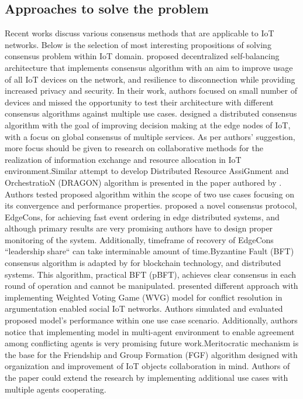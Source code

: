 \documentclass[	DIV=calc,%
							paper=a4,%
							fontsize=11pt,%
							twocolumn]{scrartcl}	 				%
\begin{document}
\subsection{Approaches to solve the problem}
Recent works discuss various consensus methods that are applicable to IoT  networks. Below is the selection of most interesting propositions of solving consensus problem within IoT domain.\smallskip \newline {} proposed decentralized self-balancing architecture that implements consensus algorithm with an aim to improve usage of all IoT devices on the network, and resilience to disconnection while providing increased privacy and security. In their work, authors focused on small number of devices and missed the opportunity to test their architecture with different consensus algorithms against multiple use cases.\smallskip \newline {} designed a distributed consensus algorithm with the goal of improving decision making at the edge nodes of IoT, with a focus on global consensus of multiple services. As per authors’ suggestion, more focus should be given to research on collaborative methods for the realization of information exchange and resource allocation in IoT environment.\smallskip \newline Similar attempt to develop Distributed Resource AssiGnment and OrchestratioN (DRAGON) algorithm is presented in the paper authored by . Authors tested proposed algorithm within the scope of two use cases focusing on  its convergence and performance properties.\smallskip \newline  {} proposed a novel consensus protocol, EdgeCons, for achieving fast event ordering in edge distributed systems, and although primary results are very promising authors have to design proper monitoring of the system. Additionally, timeframe of recovery of EdgeCons ``leadership share`` can take interminable amount of time.\smallskip \newline Byzantine Fault (BFT) consensus algorithm  is adapted by  for blockchain technology, and distributed systems. This algorithm, practical BFT (pBFT), achieves clear consensus in each round of operation and cannot be manipulated.\smallskip \newline {} presented different approach with implementing Weighted Voting Game (WVG) model for conflict resolution in argumentation enabled social IoT networks. Authors simulated and evaluated proposed model’s performance within one use case scenario. Additionally, authors notice that implementing model in multi-agent environment to enable agreement among conflicting agents is very promising future work.\smallskip \newline Meritocratic mechanism is the base for  the Friendship and Group Formation (FGF) algorithm designed with  organization and improvement of IoT objects collaboration in mind. Authors of the paper could extend the research by implementing additional use cases with multiple agents cooperating.\smallskip \newline  
\end{document}
